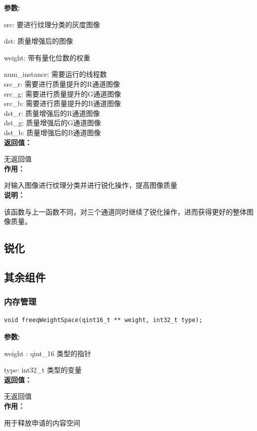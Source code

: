 \documentclass[12pt, a4paper, oneside]{ctexbook}
\begin{document}
\begin{enumerate}
			\textbf{参数:} \par src: 要进行纹理分类的灰度图像 \par dst: 质量增强后的图像\par weight: 带有量化位数的权重\par num\_instance: 需要运行的线程数 \\ src\_r: 需要进行质量提升的R通道图像 \\ src\_g: 需要进行质量提升的G通道图像 \\ src\_b: 需要进行质量提升的B通道图像 \\ dst\_r: 质量增强后的R通道图像 \\ dst\_g: 质量增强后的G通道图像 \\ dst\_b: 质量增强后的B通道图像\\
			\textbf{返回值：}\par 无返回值\\
			\textbf{作用：}\par 对输入图像进行纹理分类并进行锐化操作，提高图像质量\\
			\textbf{说明：}\par 该函数与上一函数不同，对三个通道同时继续了锐化操作，进而获得更好的整体图像质量。
			
			
		\end{enumerate}
		
		
		
		\subsection{锐化}
		\subsection{其余组件}
		\subsubsection{内存管理}
		\begin{lstlisting}[numbers=none]
void freeqWeightSpace(qint16_t ** weight, int32_t type);
		\end{lstlisting}
		\textbf{参数:} \par weight : qint\_16 类型的指针 \par type: int32\_t 类型的变量 \\
		\textbf{返回值：}\par 无返回值 \\
		\textbf{作用：}\par 用于释放申请的内容空间\\
		
\end{document}

